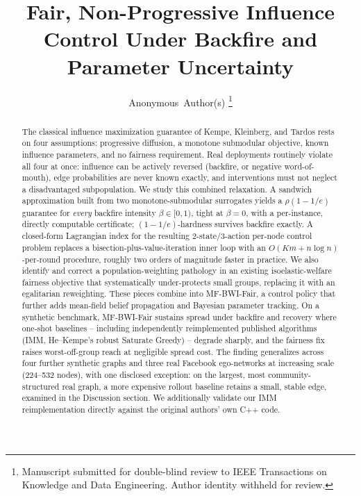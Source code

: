 \documentclass[journal]{IEEEtran}
\begin{document}
\title{Fair, Non-Progressive Influence Control Under Backfire and Parameter Uncertainty}

\author{Anonymous~Author(s)
\thanks{Manuscript submitted for double-blind review to IEEE Transactions
on Knowledge and Data Engineering. Author identity withheld for review.}}


\maketitle

\begin{abstract}
The classical influence maximization guarantee of Kempe, Kleinberg, and
Tardos rests on four assumptions: progressive diffusion, a monotone
submodular objective, known influence parameters, and no fairness
requirement. Real deployments routinely violate all four at once: influence
can be actively reversed (backfire, or negative word-of-mouth), edge
probabilities are never known exactly, and interventions must not neglect a
disadvantaged subpopulation. We study this combined relaxation. A sandwich
approximation built from two monotone-submodular surrogates yields a
$\rho(1-1/e)$ guarantee for \emph{every} backfire intensity
$\beta\in[0,1)$, tight at $\beta=0$, with a per-instance, directly
computable certificate; $(1-1/e)$-hardness survives backfire exactly. A
closed-form Lagrangian index for the resulting 2-state/3-action per-node
control problem replaces a bisection-plus-value-iteration inner loop with
an $O(Km+n\log n)$-per-round procedure, roughly two orders of magnitude
faster in practice. We also identify and correct a population-weighting
pathology in an existing isoelastic-welfare fairness objective that
systematically under-protects small groups, replacing it with an
egalitarian reweighting. These pieces combine into MF-BWI-Fair, a control
policy that further adds mean-field belief propagation and Bayesian
parameter tracking. On a synthetic benchmark, MF-BWI-Fair sustains spread
under backfire and recovery where one-shot baselines -- including
independently reimplemented published algorithms (IMM, He--Kempe's robust
Saturate Greedy) -- degrade sharply, and the fairness fix raises
worst-off-group reach at negligible spread cost. The finding generalizes
across four further synthetic graphs and three real Facebook ego-networks
at increasing scale (224--532 nodes), with one disclosed exception: on the
largest, most community-structured real graph, a more expensive rollout
baseline retains a small, stable edge, examined in the Discussion section.
We additionally validate our IMM reimplementation directly against the
original authors' own C++ code.
\end{abstract}
\end{document}
